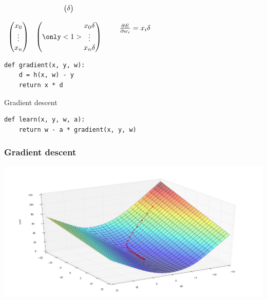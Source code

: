 \begin{frame}
  $
  \begin{array}{cc}
    &
    \left(
      \begin{matrix}
        \delta \\
      \end{matrix}
    \right) \\
    &\\
    \left(
      \begin{matrix}
        x_0 \\
        \vdots \\
        x_n
      \end{matrix}
    \right) & \left(
      \only<1>{\begin{matrix}
        x_0 \delta \\
        \vdots \\
        x_n \delta
      \end{matrix}}
    \right)
  \end{array}
  \qquad \frac{\partial E}{\partial w_i} = x_i \delta
  $
\end{frame}

\begin{frame}[fragile]
  \begin{block}{}
    \begin{lstlisting}
def gradient(x, y, w):
    d = h(x, w) - y
    return x * d
    \end{lstlisting}
  \end{block}
\end{frame}

\begin{frame}[fragile]
  \begin{block}{Gradient descent}
    \begin{lstlisting}
def learn(x, y, w, a):
    return w - a * gradient(x, y, w)
    \end{lstlisting}
  \end{block}
\end{frame}

\begin{frame}
  \frametitle{Gradient descent}
  \begin{center}
    \includegraphics[scale=0.22]{./pictures/gradient_descent.png}
  \end{center}
\end{frame}

